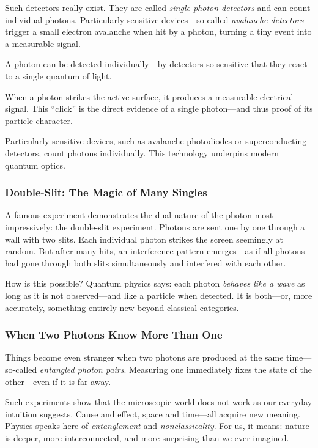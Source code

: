 Such detectors really exist. They are called \textit{single-photon detectors} and can count individual photons. Particularly sensitive devices—so-called \textit{avalanche detectors}—trigger a small electron avalanche when hit by a photon, turning a tiny event into a measurable signal.
\vspace{1em}
\begin{tcolorbox}[physikbox, title=The Single Photon – When It Clicks]
	\label{box:einzelphoton}
	A photon can be detected individually—by detectors so sensitive that they react to a single quantum of light.
	
	When a photon strikes the active surface, it produces a measurable electrical signal. This “click” is the direct evidence of a single photon—and thus proof of its particle character.
	
	Particularly sensitive devices, such as avalanche photodiodes or superconducting detectors, count photons individually. This technology underpins modern quantum optics.
\end{tcolorbox}
\newpage
\noindent
\subsubsection{Double-Slit: The Magic of Many Singles}
A famous experiment demonstrates the dual nature of the photon most impressively: the double-slit experiment. Photons are sent one by one through a wall with two slits. Each individual photon strikes the screen seemingly at random. But after many hits, an interference pattern emerges—as if all photons had gone through both slits simultaneously and interfered with each other.

How is this possible? Quantum physics says: each photon \emph{behaves like a wave} as long as it is not observed—and like a particle when detected. It is both—or, more accurately, something entirely new beyond classical categories.

\subsubsection{When Two Photons Know More Than One}
Things become even stranger when two photons are produced at the same time—so-called \textit{entangled photon pairs}. Measuring one immediately fixes the state of the other—even if it is far away.

Such experiments show that the microscopic world does not work as our everyday intuition suggests. Cause and effect, space and time—all acquire new meaning. Physics speaks here of \textit{entanglement} and \textit{nonclassicality}. For us, it means: nature is deeper, more interconnected, and more surprising than we ever imagined.

